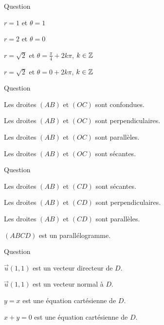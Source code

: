 \begin{multi}[multiple,feedback=
{D'abord, \(r=\sqrt{1^2+1^2}=\sqrt{2}\) et \(\theta \) est solution du système : 
\[\left\{\begin{array}{l}\displaystyle \cos \theta =\frac{1}{\sqrt{2}}\\ \\ \displaystyle \sin \theta =\frac{1}{\sqrt{2}}.\end{array}\right.\]
}]{Question}
    \item \(r=1\) et \(\theta =1\)
    \item \(r=2\) et \(\theta =0\)
    \item* \(r=\sqrt{2}\) et \(\displaystyle \theta =\frac{\pi}{4}+2k\pi\), \(k\in \mathbb{Z}\)
    \item \(r=\sqrt{2}\) et \(\theta =0+2k\pi\), \(k\in \mathbb{Z}\)
\end{multi}


\begin{multi}[multiple,feedback=
{On a \(\overrightarrow{AB}=(2,2)=2\overrightarrow{OC}\). Les droites \((AB)\) et \((OC)\) sont parallèles.
}]{Question}
    \item Les droites \((AB)\) et \((OC)\) sont confondues.
    \item Les droites \((AB)\) et \((OC)\) sont perpendiculaires.
    \item* Les droites \((AB)\) et \((OC)\) sont parallèles.
    \item Les droites \((AB)\) et \((OC)\) sont sécantes.
\end{multi}


\begin{multi}[multiple,feedback=
{On a \(\overrightarrow{AB}=(0,2)=-\overrightarrow{CD}\), donc les droites \((AB)\) et \((CD)\) sont parallèles. De plus, \(AB=CD\), donc \((ABCD)\) est un parallélogramme.
}]{Question}
    \item Les droites \((AB)\) et \((CD)\) sont sécantes.
    \item Les droites \((AB)\) et \((CD)\) sont perpendiculaires.
    \item* Les droites \((AB)\) et \((CD)\) sont parallèles.
    \item* \((ABCD)\) est un parallélogramme.
\end{multi}


\begin{multi}[multiple,feedback=
{La droite \(D\) est dirigée par le vecteur \(\overrightarrow{OA}=\vec{u}(1,1)\) et \(M(x,y)\in D \Leftrightarrow \mbox{det}(\overrightarrow{OM},\overrightarrow{OA})=0\Leftrightarrow x-y=0\). Ceci donne une équation cartésienne de \(D\).
}]{Question}
    \item* \(\vec{u}(1,1)\) est un vecteur directeur de \(D\).
    \item \(\vec{u}(1,1)\) est un vecteur normal à \(D\).
    \item* \(y=x\) est une équation cartésienne de \(D\).
    \item \(x+y=0\) est une équation cartésienne de \(D\).
\end{multi}


